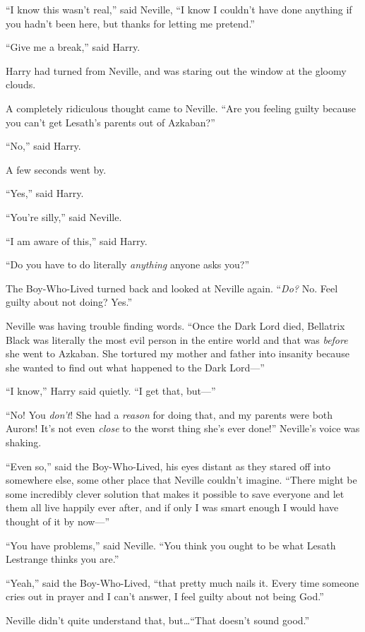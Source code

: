 “I know this wasn’t real,” said Neville, “I know I couldn’t have done anything if you hadn’t been here, but thanks for letting me pretend.”

“Give me a break,” said Harry.

Harry had turned from Neville, and was staring out the window at the gloomy clouds.

A completely ridiculous thought came to Neville. “Are you feeling guilty because you can’t get Lesath’s parents out of Azkaban?”

“No,” said Harry.

A few seconds went by.

“Yes,” said Harry.

“You’re silly,” said Neville.

“I am aware of this,” said Harry.

“Do you have to do literally \emph{anything} anyone asks you?”

The Boy-Who-Lived turned back and looked at Neville again. “\emph{Do?} No. Feel guilty about not doing? Yes.”

Neville was having trouble finding words. “Once the Dark Lord died, Bellatrix Black was literally the most evil person in the entire world and that was \emph{before} she went to Azkaban. She tortured my mother and father into insanity because she wanted to find out what happened to the Dark Lord—”

“I know,” Harry said quietly. “I get that, but—”

“No! You \emph{don’t}! She had a \emph{reason} for doing that, and my parents were both Aurors! It’s not even \emph{close} to the worst thing she’s ever done!” Neville’s voice was shaking.

“Even so,” said the Boy-Who-Lived, his eyes distant as they stared off into somewhere else, some other place that Neville couldn’t imagine. “There might be some incredibly clever solution that makes it possible to save everyone and let them all live happily ever after, and if only I was smart enough I would have thought of it by now—”

“You have problems,” said Neville. “You think you ought to be what Lesath Lestrange thinks you are.”

“Yeah,” said the Boy-Who-Lived, “that pretty much nails it. Every time someone cries out in prayer and I can’t answer, I feel guilty about not being God.”

Neville didn’t quite understand that, but…“That doesn’t sound good.”

